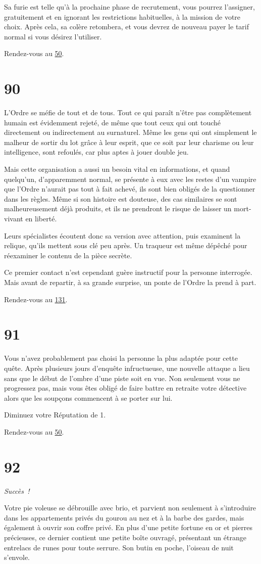\documentclass{report}
\newcommand{\gsection}[1]{
    \section{#1}
    \label{section-#1}
}
\newcommand{\glink}[1]{\hyperref[section-#1]{#1}}
\newcommand{\success}{\emph{Succès !}}
\begin{document}
Sa furie est telle qu'à la prochaine phase de recrutement, vous pourrez l'assigner, gratuitement et en ignorant les restrictions habituelles, à la mission de votre choix. Après cela, sa colère retombera, et vous devrez de nouveau payer le tarif normal si vous désirez l'utiliser.

Rendez-vous au \glink{50}.

\gsection{90}

L'Ordre se méfie de tout et de tous. Tout ce qui paraît n'être pas complètement humain est évidemment rejeté, de même que tout ceux qui ont touché directement ou indirectement au surnaturel. Même les gens qui ont simplement le malheur de sortir du lot grâce à leur esprit, que ce soit par leur charisme ou leur intelligence, sont refoulés, car plus aptes à jouer double jeu.

Mais cette organisation a aussi un besoin vital en informations, et quand quelqu'un, d'apparemment normal, se présente à eux avec les restes d'un vampire que l'Ordre n'aurait pas tout à fait achevé, ils sont bien obligés de la questionner dans les règles. Même si son histoire est douteuse, des cas similaires se sont malheureusement déjà produits, et ils ne prendront le risque de laisser un mort-vivant en liberté.

Leurs spécialistes écoutent donc sa version avec attention, puis examinent la relique, qu'ils mettent sous clé peu après. Un traqueur est même dépêché pour réexaminer le contenu de la pièce secrète.

Ce premier contact n'est cependant guère instructif pour la personne interrogée. Mais avant de repartir, à sa grande surprise, un ponte de l'Ordre la prend à part.

Rendez-vous au \glink{131}.

\gsection{91}

Vous n'avez probablement pas choisi la personne la plus adaptée pour cette quête. Après plusieurs jours d'enquête infructueuse, une nouvelle attaque a lieu sans que le début de l'ombre d'une piste soit en vue. Non seulement vous ne progressez pas, mais vous êtes obligé de faire battre en retraite votre détective alors que les soupçons commencent à se porter sur lui. 

Diminuez votre Réputation de 1.

Rendez-vous au \glink{50}.

\gsection{92}

\success

Votre pie voleuse se débrouille avec brio, et parvient  non seulement à s'introduire dans les appartements privés du gourou au nez et à la barbe des gardes, mais également à ouvrir son coffre privé. En plus d'une petite fortune en or et pierres précieuses, ce dernier contient une petite boîte ouvragé, présentant un étrange entrelacs de runes pour toute serrure. Son butin en poche, l'oiseau de nuit s'envole.
\end{document}
